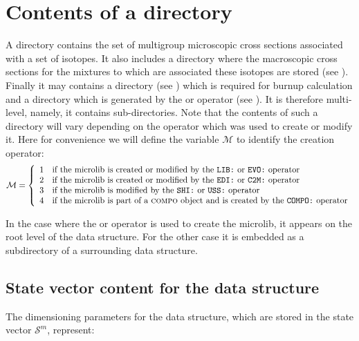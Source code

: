 \section{Contents of a  directory}\label{sect:microlibdir}

A  directory contains the set of multigroup microscopic 
cross sections associated with a set of isotopes. It also includes a  directory
where the macroscopic cross sections for the mixtures to which are associated these
isotopes are stored (see ). Finally it may contains a  directory
(see ) which is required for burnup calculation and a 
directory which is generated by the  or  operator (see
). It is
therefore multi-level, namely, it contains sub-directories. Note that the contents of such a
directory will vary depending on the operator which was used to create or modify it. Here for
convenience we will define the variable
$\mathcal{M}$ to identify the creation operator:
\begin{displaymath}
\mathcal{M} = \left\{
\begin{array}{ll}
1 & \textrm{if the microlib is created or modified by the \moc{LIB:} or \moc{EVO:} operator}\\
2 & \textrm{if the microlib is created or modified by the \moc{EDI:} or
\moc{C2M:} operator}\\
3 & \textrm{if the microlib is modified by the \moc{SHI:} or \moc{USS:} operator}\\
4 & \textrm{if the microlib is part of a {\sc compo} object and is created by the \moc{COMPO:} operator}
\end{array} \right.
\end{displaymath}

In the case where the  or  operator is used to create the microlib, it appears on the root
level of the data structure. For the other case it is embedded as a
subdirectory of a surrounding data structure.

\subsection{State vector content for the  data structure}\label{sect:microlibstate}

The dimensioning parameters for the  data structure, which are stored in
the state vector $\mathcal{S}^{m}$, represent:

